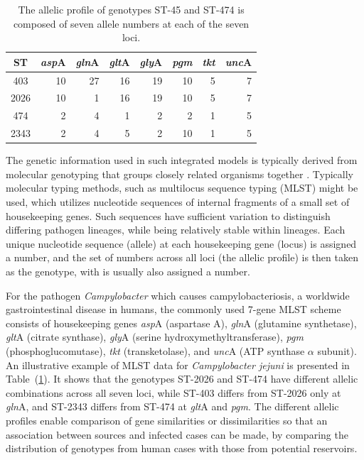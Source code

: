 \documentclass[times, doublespace]{simauth}%
\begin{document}
\begin{table}
  \begin{center}
    \begin{tabular}{crrrrrrr}
      \toprule
      ST & \textit{asp}A & \textit{gln}A & \textit{glt}A & \textit{gly}A & \textit{pgm}& \textit{tkt}& \textit{unc}A\\ \midrule
      403 & 10 & 27 & 16 & 19 & 10 & 5 & 7\\
      2026 & 10 & 1 & 16 & 19 & 10 & 5 & 7\\
      474 & 2 & 4 & 1 & 2 & 2 & 1 & 5 \\
      2343 & 2 & 4 & 5 & 2 & 10 & 1 & 5\\
      \bottomrule
    \end{tabular}
  \end{center}
  \caption{The allelic profile of genotypes ST-45 and ST-474 is composed of seven allele numbers at each of the seven loci.}
  \label{tab:mlst}
\end{table}

The genetic information used in such integrated models is typically derived from molecular genotyping that groups closely related organisms together \cite{Cotta}. Typically molecular typing methods, such as multilocus sequence typing (MLST) \cite{Dingl, Coll, Urwin} might be used, which utilizes nucleotide sequences of internal fragments of a small set of housekeeping genes. Such sequences have sufficient variation to distinguish differing pathogen lineages, while being relatively stable within lineages. Each unique nucleotide sequence (allele) at each housekeeping gene (locus) is assigned a number, and the set of numbers across all loci (the allelic profile) is then taken as the genotype, with is usually also assigned a number.

For the pathogen \textit{Campylobacter} which causes campylobacteriosis, a worldwide gastrointestinal disease in humans, the commonly used 7-gene MLST scheme consists of housekeeping genes \textit{asp}A (aspartase A), \textit{gln}A (glutamine synthetase), \textit{glt}A (citrate synthase), \textit{gly}A (serine hydroxymethyltransferase), \textit{pgm} (phosphoglucomutase), \textit{tkt} (transketolase), and \textit{unc}A (ATP synthase $\alpha$ subunit). An illustrative example of MLST data for \emph{Campylobacter jejuni} is presented in Table~(\ref{tab:mlst}). It shows that the genotypes ST-2026 and ST-474 have different allelic combinations across all seven loci, while ST-403 differs from ST-2026 only at \textit{gln}A, and ST-2343 differs from ST-474 at \textit{glt}A and \textit{pgm}. The different allelic profiles enable comparison of gene similarities or dissimilarities so that an association between sources and infected cases can be made, by comparing the distribution of genotypes from human cases with those from potential reservoirs.
\end{document}
